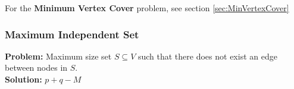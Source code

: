 \documentclass[a4paper,10pt]{article}
\begin{document}
\begin{multicols}{2}

For the \textbf{Minimum Vertex Cover} problem, see section \ref{sec:MinVertexCover}
\subsubsection*{Maximum Independent Set}
\textbf{Problem:} Maximum size set $S\subseteq V$ such that there does not exist an edge between nodes in $S$.\\
\textbf{Solution:} $p+q-M$

%

%

\end{multicols}
\end{document}
